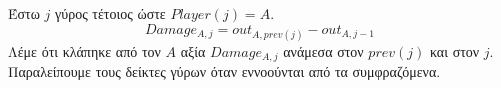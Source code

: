 {}
\begin{definition}[Ζημία]
  Έστω $j$ γύρος τέτοιος ώστε $Player\left(j\right) = A$.
  \begin{equation}
    Damage_{A, j} = out_{A, prev\left(j\right)} - out_{A, j-1}
  \end{equation}
  Λέμε ότι κλάπηκε από τον $A$ αξία $Damage_{A, j}$ ανάμεσα στον $prev\left(j\right)$ και στον $j$. Παραλείπουμε τους δείκτες
  γύρων όταν εννοούνται από τα συμφραζόμενα.
\end{definition}
